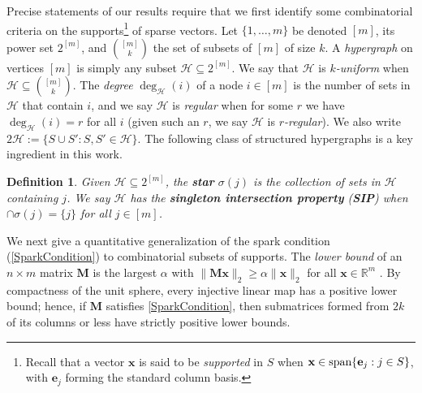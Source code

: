 \documentclass[journal, twocolumn]{IEEEtran}
\newtheorem{definition}{Definition}
\begin{document}

Precise statements of our results require that we first identify some combinatorial criteria on the supports\footnote{Recall that a vector $\mathbf{x}$ is said to be \emph{supported} in $S$ when $\mathbf{x} \in \text{\rm span}\{\mathbf{e}_j: j\in S\}$, with $\mathbf{e}_j$ forming the standard column basis.} of sparse vectors. Let $\{1, \ldots, m\}$ be denoted $[m]$, its power set $2^{[m]}$, and ${[m] \choose k}$ the set of subsets of $[m]$ of size $k$.  A \emph{hypergraph} on vertices $[m]$  is simply any subset $\mathcal{H} \subseteq 2^{[m]}$. We say that $\mathcal{H}$ is \textit{$k$-uniform} when $\mathcal{H} \subseteq {[m] \choose k}$. The \emph{degree} $\deg_\mathcal{H}(i)$ of a node $i \in [m]$ is the number of sets in $\mathcal{H}$ that contain $i$, and we say $\mathcal{H}$ is \emph{regular} when for some $r$ we have $\deg_\mathcal{H}(i) = r$ for all $i$ (given such an $r$, we say $\mathcal{H}$ is \textit{$r$-regular}). We also write $2\mathcal{H} := \{ S \cup S': S, S' \in \mathcal{H}\}$.  The following class of structured hypergraphs is a key ingredient in this work.

\begin{definition}\label{sip}
Given $\mathcal{H} \subseteq 2^{[m]}$, the \textbf{star} $\sigma(j)$ is the collection of sets in $\mathcal{H}$ containing $j$. We say $\mathcal{H}$ has the \textbf{singleton intersection property} (\textbf{SIP}) when $\cap \sigma(j) = \{j\}$ for all $j \in [m]$. 
\end{definition}

We next give a quantitative generalization of the spark condition (\ref{SparkCondition}) to combinatorial subsets of supports. The \emph{lower bound} of an $n \times m$ matrix $\mathbf{M}$ is the largest $\alpha$ with \mbox{$\|\mathbf{M}\mathbf{x}\|_2 \geq \alpha\|\mathbf{x}\|_2$} for all $\mathbf{x} \in \mathbb{R}^m$ \cite{Grcar10}. By compactness of the unit sphere, every injective linear map has a positive lower bound; hence, if $\mathbf{M}$ satisfies \eqref{SparkCondition}, then submatrices formed from $2k$ of its columns or less have strictly positive lower bounds. 
\end{document}
